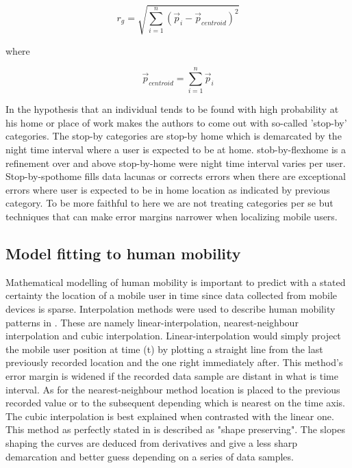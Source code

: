 \documentclass[12pt, a4paper]{report}
\theoremstyle{definition}
\theoremstyle{definition}%
\theoremstyle{definition}%
\theoremstyle{definition}%
\theoremstyle{definition}%
\theoremstyle{definition}%
\begin{document}
\begin{equation} \label{radius_gyration}
r_{g} = \sqrt{\sum _{i=1}^{n}({\stackrel{\to }{p}}_{i}-{\stackrel{\to }{p}}_{centroid})^2}
\end{equation}

where 

\begin{equation}
{\stackrel{\to }{p}}_{centroid} = \sum _{i=1}^{n}{\stackrel{\to }{p}}_{i}
\end{equation}

In \cite{Hoteit2016} the hypothesis that an individual tends to be found with high probability at his home or place of work makes the authors to come out with so-called 'stop-by' categories. The stop-by categories are stop-by home which is demarcated by the night time interval where a user is expected to be at home. stob-by-flexhome is a refinement over and above stop-by-home were night time interval varies per user. Stop-by-spothome fills data lacunas or corrects errors when there are exceptional errors where user is expected to be in home location as indicated by previous category. To be more faithful to \cite{Hoteit2016} here we are not treating categories per se but techniques that can make error margins narrower when localizing mobile users.

\subsection{Model fitting to human mobility} \label{methodology_modelling}
Mathematical modelling of human mobility is important to predict with a stated certainty the location of a mobile user in time since data collected from mobile devices is sparse. Interpolation methods were used to describe human mobility patterns in \cite{Hoteit2014}. These are namely linear-interpolation, nearest-neighbour interpolation and cubic interpolation. Linear-interpolation would simply project the mobile user position at time (t) by plotting a straight line from the last previously recorded location and the one right immediately after. This method's error margin is widened if the recorded data sample are distant in what is time interval. As for the nearest-neighbour method location is placed to the previous recorded value or to the subsequent depending which is nearest on the time axis. The cubic interpolation is best explained when contrasted with the linear one. This method as perfectly stated in \cite{Hoteit2014}  is described as "shape preserving". The slopes shaping the curves are deduced from derivatives and give a less sharp demarcation and better guess depending on a series of data samples.
\end{document}
